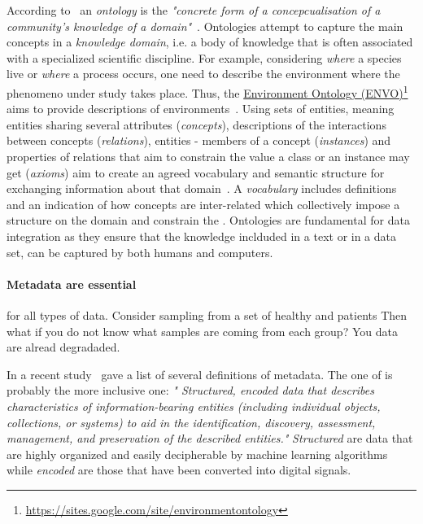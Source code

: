       According to~\citeauthor{stevens2000ontology} an \textit{ontology} is the \textit{"concrete form of a concepcualisation
      of a community's knowledge of a domain"}~\cite{stevens2000ontology}.
      Ontologies attempt to capture the main concepts in a \textit{knowledge domain}, 
      i.e. a body of knowledge that is often associated with a
      specialized scientific discipline. 
      For example, considering \textit{where} a species live or \textit{where} a process occurs, one need to describe the environment where the phenomeno under study 
      takes place. 
      Thus, the \href{https://sites.google.com/site/environmentontology}{Environment Ontology (ENVO)}\footnote{\href{https://sites.google.com/site/environmentontology}{https://sites.google.com/site/environmentontology}} aims to provide descriptions of environments~\cite{buttigieg2016environment}.
      Using sets of entities, meaning entities sharing several attributes (\textit{concepts}), 
      descriptions of the interactions between concepts (\textit{relations}), 
      entities - members of a concept (\textit{instances}) and 
      properties of relations that aim to constrain the value a class or an instance may get (\textit{axioms}) aim to create an agreed vocabulary and
      semantic structure for exchanging
      information about that domain~\cite{stevens2000ontology}. 
      A \textit{vocabulary} includes definitions and an indication of how concepts are inter-related which collectively impose a structure on the domain and constrain the
      \cite{uschold1998enterprise}.
      Ontologies are fundamental for data integration as they ensure that the knowledge
      inclduded in a text or in a data set, can be captured by both humans and computers. 


      \paragraph{Metadata are essential} for all types of data. 
      Consider sampling from a set of healthy and patients 
      Then what if you do not know what samples are coming from each group? 
      You data are alread degradaded. 

      In a recent study~\citeauthor{furner2020definitions} gave a list of several definitions of metadata.
      The one of \citeauthor{zeng_qin_2016} is probably the more inclusive one:
      \textit{"
      Structured, encoded data that describes characteristics of information-bearing entities
      (including individual objects, collections, or systems) to aid in the identification,
      discovery, assessment, management, and preservation of the described entities."
      }
      \textit{Structured} are data that are highly organized and easily decipherable by machine learning algorithms while
      \textit{encoded} are those that have been converted into digital signals.

